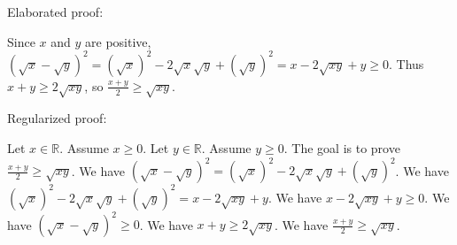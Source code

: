 \documentclass{article}
\begin{document}
Elaborated proof:
\begin{tcolorbox}[colback=green!10, width=\linewidth]
Since $x$ and $y$ are positive, $(\sqrt x - \sqrt y)^2 = (\sqrt x)^2 - 2\sqrt x \sqrt y + (\sqrt y)^2 = x - 2\sqrt{xy} + y \ge 0$. Thus $x + y \ge 2\sqrt{xy}$, so $\frac{x+y}{2} \ge \sqrt{xy}$.
\end{tcolorbox}

Regularized proof:
\begin{tcolorbox}[colback=red!10, width=\linewidth]
Let $x\in\mathbb{R}$. Assume $x\ge 0$.
Let $y\in\mathbb{R}$. Assume $y\ge 0$.
The goal is to prove $\frac{x+y}{2} \ge \sqrt{xy}$.
We have ${{(\sqrt x - \sqrt y)}}^2 = {{(\sqrt x)}}^2 - 2\sqrt x \sqrt y + {{(\sqrt y)}}^2$.
We have ${{(\sqrt x)}}^2 - 2\sqrt x \sqrt y + {{(\sqrt y)}}^2 = x - 2\sqrt{xy} + y$.
We have $x - 2\sqrt{xy} + y \ge 0$.
We have ${{(\sqrt x - \sqrt y)}}^2 \ge 0$.
We have $x + y \ge 2\sqrt{xy}$.
We have $\frac{x+y}{2} \ge \sqrt{xy}$.
\end{tcolorbox}
\end{document}
